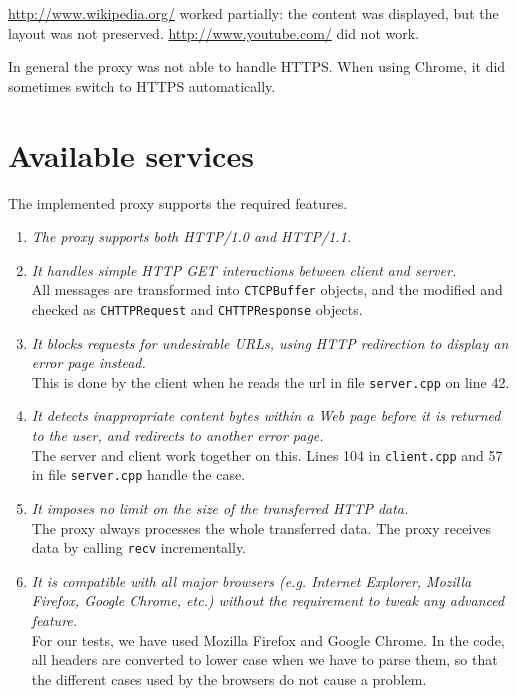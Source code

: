 \documentclass[12pt,a4paper]{article}
\begin{document}
\url{http://www.wikipedia.org/} worked partially: the content was displayed, but the layout was not preserved. \url{http://www.youtube.com/} did not work.

In general the proxy was not able to handle HTTPS. When using Chrome, it did sometimes switch to HTTPS automatically.

\section{Available services} 
The implemented proxy supports the required features.

\begin{enumerate}
\item \textit{The proxy supports both HTTP/1.0 and HTTP/1.1.}

\item \textit{It handles simple HTTP GET interactions between client and server.}\\
All messages are transformed into \texttt{CTCPBuffer} objects, and the modified and checked as \texttt{CHTTPRequest} and \texttt{CHTTPResponse} objects. 

\item \textit{It blocks requests for undesirable URLs, using HTTP redirection to display an error page instead.}\\
This is done by the client when he reads the url in file \texttt{server.cpp} on line 42.

\item \textit{It detects inappropriate content bytes within a Web page before it is returned to the user, and redirects to another error page.}\\
The server and client work together on this. Lines 104 in \texttt{client.cpp} and 57 in file \texttt{server.cpp} handle the case.

\item \textit{It imposes no limit on the size of the transferred HTTP data.}\\
The proxy always processes the whole transferred data. The proxy receives data by calling \texttt{recv} incrementally.

\item \textit{It is compatible with all major browsers (e.g. Internet Explorer, Mozilla Firefox, Google Chrome, etc.) without the requirement to tweak any advanced feature.}\\
For our tests, we have used Mozilla Firefox and Google Chrome. In the code, all headers are converted to lower case when we have to parse them, so that the different cases used by the browsers do not cause a problem.


\end{enumerate}
\end{document}
